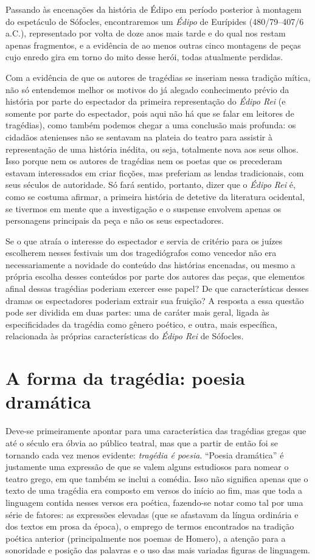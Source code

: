 Passando às encenações da história de Édipo em período posterior à
montagem do espetáculo de Sófocles, encontraremos um \emph{Édipo} de
Eurípides (480/79--407/6 a.C.), representado por volta de doze anos mais
tarde e do qual nos restam apenas fragmentos, e a evidência de ao menos
outras cinco montagens de peças cujo enredo gira em torno do mito desse
herói, todas atualmente perdidas.

Com a evidência de que os autores de tragédias se inseriam nessa
tradição mítica, não só entendemos melhor os motivos do já alegado
conhecimento prévio da história por parte do espectador da primeira
representação do \emph{Édipo Rei} (e somente por parte do espectador,
pois aqui não há que se falar em leitores de tragédias), como também
podemos chegar a uma conclusão mais profunda: os cidadãos atenienses não
se sentavam na plateia do teatro para assistir à representação de uma
história inédita, ou seja, totalmente nova aos seus olhos. Isso porque
nem os autores de tragédias nem os poetas que os precederam estavam
interessados em criar ficções, mas preferiam as lendas tradicionais, com
seus séculos de autoridade. Só fará sentido, portanto, dizer que o
\emph{Édipo Rei} é, como se costuma afirmar, a primeira história de
detetive da literatura ocidental, se tivermos em mente que a
investigação e o suspense envolvem apenas os personagens principais da
peça e não os seus espectadores.

Se o que atraía o interesse do espectador e servia de critério para os
juízes escolherem nesses festivais um dos tragediógrafos como vencedor
não era necessariamente a novidade do conteúdo das histórias encenadas,
ou mesmo a própria escolha desses conteúdos por parte dos autores das
peças, que elementos afinal dessas tragédias poderiam exercer esse
papel? De que características desses dramas os espectadores poderiam
extrair sua fruição? A resposta a essa questão pode ser dividida em duas
partes: uma de caráter mais geral, ligada às especificidades da tragédia
como gênero poético, e outra, mais específica, relacionada às próprias
características do \emph{Édipo Rei} de Sófocles.

\section{A forma da tragédia: poesia dramática}

Deve-se primeiramente apontar para uma característica das tragédias
gregas que até o século  era óbvia ao público teatral, mas que a
partir de então foi se tornando cada vez menos evidente: \emph{tragédia
é poesia}. ``Poesia dramática'' é justamente uma expressão de que se
valem alguns estudiosos para nomear o teatro grego, em que também se
inclui a comédia. Isso não significa apenas que o texto de uma tragédia
era composto em versos do início ao fim, mas que toda a linguagem
contida nesses versos era poética, fazendo-se notar como tal por uma
série de fatores: as expressões elevadas (que se afastavam da língua
ordinária e dos textos em prosa da época), o emprego de termos
encontrados na tradição poética anterior (principalmente nos poemas de
Homero), a atenção para a sonoridade e posição das palavras e o uso das
mais variadas figuras de linguagem.

